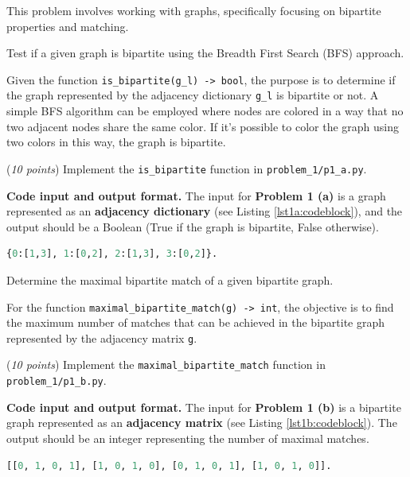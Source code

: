 \documentclass{hw}
\newcommand{\io}{\textbf{Code input and output format.} }
\begin{document}


\begin{problem}
This problem involves working with graphs, specifically focusing on bipartite properties and matching. 

\begin{subproblem}
Test if a given graph is bipartite using the Breadth First Search (BFS) approach.

Given the function \texttt{is\_bipartite(g\_l) -> bool}, the purpose is to determine if the graph represented by the adjacency dictionary \texttt{g\_l} is bipartite or not. A simple BFS algorithm can be employed where nodes are colored in a way that no two adjacent nodes share the same color. If it's possible to color the graph using two colors in this way, the graph is bipartite.

(\textit{10 points}) Implement the \texttt{is\_bipartite} function in \texttt{problem\_1/p1\_a.py}.
\end{subproblem}

\io The input for \textbf{Problem 1 (a)} is a graph represented as an \textbf{adjacency dictionary} (see Listing \ref{lst1a:codeblock}), and the output should be a Boolean (True if the graph is bipartite, False otherwise).

\begin{lstlisting}[language=Python,caption={The adjacency dictionary representation, where the keys represent a node, and the value list represents the nodes the `key' node is connected to.},label={lst1a:codeblock},captionpos=b]
{0:[1,3], 1:[0,2], 2:[1,3], 3:[0,2]}. 
\end{lstlisting}

\begin{subproblem}
Determine the maximal bipartite match of a given bipartite graph.

For the function \texttt{maximal\_bipartite\_match(g) -> int}, the objective is to find the maximum number of matches that can be achieved in the bipartite graph represented by the adjacency matrix \texttt{g}.

(\textit{10 points}) Implement the \texttt{maximal\_bipartite\_match} function in \texttt{problem\_1/p1\_b.py}.
\end{subproblem}

\io The input for \textbf{Problem 1 (b)} is a bipartite graph represented as an \textbf{adjacency matrix} (see Listing \ref{lst1b:codeblock}). The output should be an integer representing the number of maximal matches.
\begin{lstlisting}[language=Python,caption={The adjacency matrix representation, where an entry $i,j$ is 1 if there is an edge between nodes $i$ and $j$, 0 otherwise.},label={lst1b:codeblock},captionpos=b]
[[0, 1, 0, 1], [1, 0, 1, 0], [0, 1, 0, 1], [1, 0, 1, 0]]. 
\end{lstlisting}

\end{problem}
\end{document}
